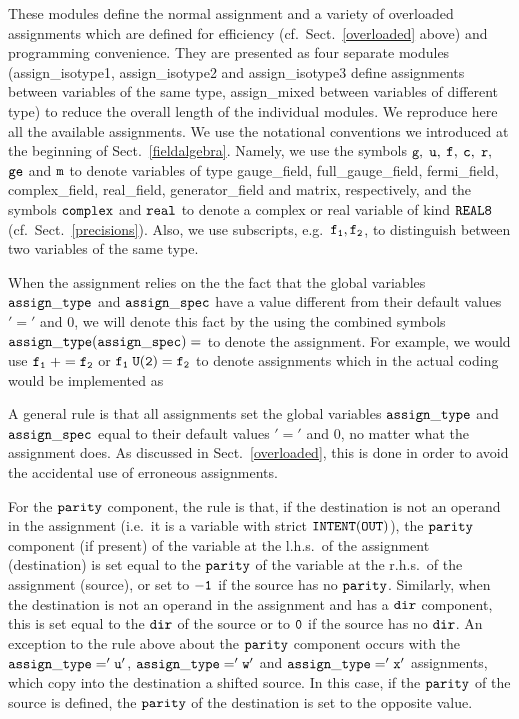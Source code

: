 These modules define the normal assignment and a variety of
overloaded assignments which are defined for efficiency 
(cf.~Sect.~\ref{overloaded} above) and programming convenience.
They are presented as four separate modules (assign\_isotype1,
assign\_isotype2  and assign\_isotype3 define assignments 
between variables of the same type,
assign\_mixed between variables of different type) to
reduce the overall length of the individual modules.  
We reproduce here all the
available assignments.  We use the notational conventions
we introduced at the beginning of Sect.~\ref{fieldalgebra}.
Namely, we use the symbols $\tt g,$ $\tt u,$
$\tt f,$ $\tt c,$ $\tt r,$ $\tt ge$ and $\tt m$ 
to denote variables of type  gauge\_field, full\_gauge\_field,
fermi\_field,  complex\_field, real\_field, 
generator\_field and  matrix, respectively, and the
symbols $\tt complex$ and $\tt real$ to denote a complex or real variable
of kind $\tt REAL8$ (cf.~Sect.~\ref{precisions}).  
Also, we use subscripts, e.g.~$\tt f_1, f_2$, to distinguish between two 
variables of the same type.

When the assignment relies on the the fact that the global 
variables $\tt assign\_type$ 
and $\tt assign\_spec$ have a value different from their default
values $'='$ and $0$, we will denote this fact by the
using the combined symbols $\tt assign\_type (assign\_spec) = $
to denote the assignment.  For example, we would use $\tt f_1 \; += f_2 $ or
$\tt f_1 \; U(2)= f_2 $ to denote assignments which in the actual coding
would be implemented as



A general rule is that all assignments set the global
variables  $\tt assign\_type$ and $\tt assign\_spec$ 
equal to their default  values $'='$ and $0$, 
no matter what the assignment does.  As discussed
in Sect.~\ref{overloaded}, this is done in order 
to avoid the accidental use of erroneous assignments.

For the $\tt parity$ component, 
the rule is that, if the destination is not an operand in the assignment 
(i.e.~it is a variable with strict $\tt INTENT(OUT)$),
the $\tt parity$ component (if present) 
of the variable at the l.h.s.~of the assignment (destination) 
is set equal to the $\tt parity$ of the variable at the 
r.h.s.~of the assignment (source), or set to $\tt -1$ if the
source has no $\tt parity$.
Similarly, when the destination is not an operand in the
assignment and has a $\tt dir$ component, this is set equal
to the  $\tt dir$ of the source or to $\tt 0$
if the source has no $\tt dir$. 
An exception to the rule above about the $\tt parity$ component occurs with 
the $\tt assign\_type = 'u'$, $\tt assign\_type = 'w'$ 
and $\tt assign\_type = 'x'$ assignments, 
which copy into the destination a shifted source.  In this case, 
if the $\tt parity$ of the source is defined, the $\tt parity$ of 
the destination is set to the opposite value.

